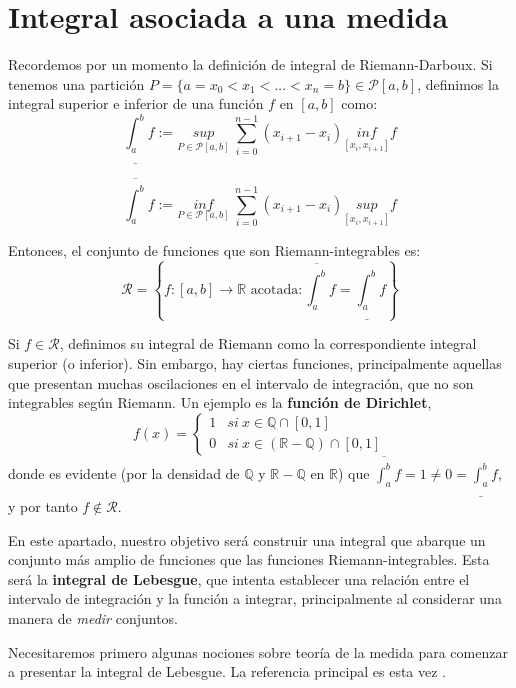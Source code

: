 \documentclass[11pt, a4paper]{article}
\theoremstyle{theorem-style}
\theoremstyle{definition-style}
\theoremstyle{remark-style}
\theoremstyle{example-style}
\begin{document}
\newpage



\section{Integral asociada a una medida}

Recordemos por un momento la definición de integral de Riemann-Darboux. Si tenemos una partición $P = \{ a = x_0 < x_1 < \dots < x_n = b\} \in \mathcal P [a,b]$, definimos la integral superior e inferior de una función $f$ en $[a,b]$ como: $$\underline{\int_a^b} f := \underset{P \in \mathcal P [a,b]}{sup} \ \sum_{i=0}^{n-1} (x_{i+1} - x_i) \underset{[x_i, x_{i+1}]}{inf} f$$

$$\overline {\int_a^b} f := \underset{P \in \mathcal P [a,b]}{inf} \ \sum_{i=0}^{n-1} (x_{i+1} - x_i) \underset{[x_i, x_{i+1}]}{sup} f$$

Entonces, el conjunto de funciones que son Riemann-integrables es: $$\mathcal R = \left\{ f:[a,b] \to \mathbb{R} \text{ acotada} : \overline {\int_a^b} f = \underline {\int_a^b} f\right\}$$

Si $f \in \mathcal R$, definimos su integral de Riemann como la correspondiente integral superior (o inferior). Sin embargo, hay ciertas funciones, principalmente aquellas que presentan muchas oscilaciones en el intervalo de integración, que no son integrables según Riemann. Un ejemplo es la \textbf{función de Dirichlet}, $$f(x) = \begin{cases} 1 & si \ x \in \mathbb Q \cap [0,1]\\ 0 & si \ x \in (\mathbb{R} - \mathbb Q) \cap [0,1] \end{cases}$$ donde es evidente (por la densidad de $\mathbb Q$ y $\mathbb{R} - \mathbb Q$ en $\mathbb{R}$) que $\displaystyle \overline {\int_a^b} f = 1 \ne 0 = \underline {\int_a^b} f$, y por tanto $f \notin \mathcal R$.

En este apartado, nuestro objetivo será construir una integral que abarque un conjunto más amplio de funciones que las funciones Riemann-integrables. Esta será la \textbf{integral de Lebesgue}, que intenta establecer una relación entre el intervalo de integración y la función a integrar, principalmente al considerar una manera de \textit{medir} conjuntos.

Necesitaremos primero algunas nociones sobre teoría de la medida para comenzar a presentar la integral de Lebesgue. La referencia principal es esta vez \cite[Chapter 1]{rudin}.
\end{document}
